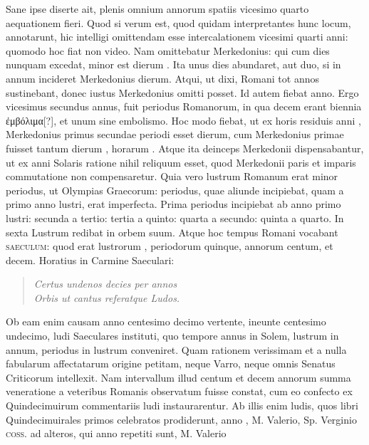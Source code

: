 Sane ipse diserte ait,
plenis omnium annorum spatiis vicesimo quarto aequationem fieri.
Quod si verum est, quod quidam interpretantes hunc locum, annotarunt,
hic intelligi omittendam esse intercalationem vicesimi quarti
anni: quomodo hoc fiat non video.
Nam omittebatur Merkedonius:
qui cum  dies nunquam excedat, minor est dierum
.
Ita unus dies abundaret, aut duo, si in  annum incideret
Merkedonius  dierum.
Atqui, ut dixi, Romani tot annos
sustinebant, donec iustus Merkedonius omitti posset.
Id autem fiebat
 anno.
Ergo vicesimus secundus annus, fuit periodus Romanorum,
in qua decem erant biennia \textgreek{ἐμβόλιμα[?]}, et unum sine embolismo.
%
Hoc modo fiebat,
 ut ex  horis residuis anni , Merkedonius
primus secundae periodi esset  dierum, cum Merkedonius
primae fuisset tantum dierum , horarum .
Atque ita
deinceps Merkedonii dispensabantur, ut ex anni Solaris ratione
nihil reliquum esset, quod Merkedonii paris et imparis commutatione
non compensaretur.
Quia vero lustrum Romanum erat
minor periodus, ut Olympias Graecorum: periodus, quae aliunde
incipiebat, quam a primo anno lustri, erat imperfecta.
Prima periodus
incipiebat ab anno primo lustri: secunda a tertio: tertia a
quinto: quarta a secundo: quinta a quarto.
In sexta Lustrum redibat
in orbem suum.
Atque hoc tempus Romani vocabant \textsc{saeculum}:
quod erat lustrorum , periodorum quinque, annorum centum,
et decem.
Horatius in Carmine Saeculari:
\begin{verse}
  \textit{Certus undenos decies per annos\\
  Orbis ut cantus referatque Ludos.}
\end{verse}
Ob eam enim causam anno centesimo decimo vertente, ineunte
centesimo undecimo, ludi Saeculares instituti, quo tempore annus
in Solem, lustrum in annum, periodus in lustrum conveniret.
Quam
rationem verissimam et a nulla fabularum affectatarum origine petitam,
neque Varro, neque omnis Senatus Criticorum intellexit.
Nam intervallum illud centum et decem annorum summa veneratione
a veteribus Romanis observatum fuisse constat, cum eo
confecto ex Quindecimuirum commentariis ludi instaurarentur.
Ab illis enim ludis, quos libri Quindecimuirales primos celebratos
prodiderunt, anno , M. Valerio, Sp. Verginio
\textsc{coss.} ad alteros, qui anno  repetiti sunt, M. Valerio
